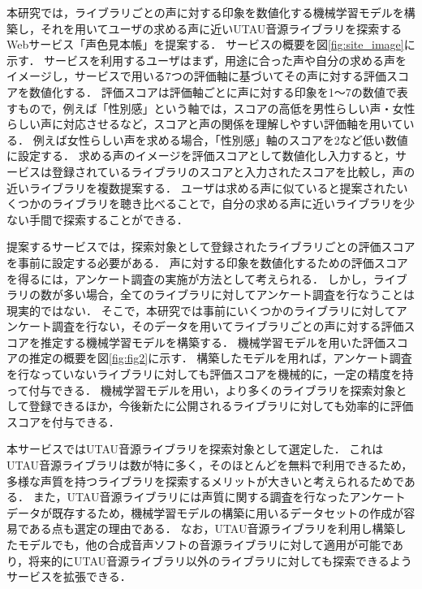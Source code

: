 本研究では，ライブラリごとの声に対する印象を数値化する機械学習モデルを構築し，それを用いてユーザの求める声に近いUTAU音源ライブラリを探索するWebサービス「声色見本帳」を提案する．
サービスの概要を図\ref{fig:site_image}に示す．
サービスを利用するユーザはまず，用途に合った声や自分の求める声をイメージし，サービスで用いる7つの評価軸に基づいてその声に対する評価スコアを数値化する．
評価スコアは評価軸ごとに声に対する印象を1〜7の数値で表すもので，例えば「性別感」という軸では，スコアの高低を男性らしい声・女性らしい声に対応させるなど，スコアと声の関係を理解しやすい評価軸を用いている．
例えば女性らしい声を求める場合，「性別感」軸のスコアを2など低い数値に設定する．
求める声のイメージを評価スコアとして数値化し入力すると，サービスは登録されているライブラリのスコアと入力されたスコアを比較し，声の近いライブラリを複数提案する．
ユーザは求める声に似ていると提案されたいくつかのライブラリを聴き比べることで，自分の求める声に近いライブラリを少ない手間で探索することができる．

提案するサービスでは，探索対象として登録されたライブラリごとの評価スコアを事前に設定する必要がある．
声に対する印象を数値化するための評価スコアを得るには，アンケート調査の実施が方法として考えられる．
しかし，ライブラリの数が多い場合，全てのライブラリに対してアンケート調査を行なうことは現実的ではない．
そこで，本研究では事前にいくつかのライブラリに対してアンケート調査を行ない，そのデータを用いてライブラリごとの声に対する評価スコアを推定する機械学習モデルを構築する．
機械学習モデルを用いた評価スコアの推定の概要を図\ref{fig:fig2}に示す．
構築したモデルを用れば，アンケート調査を行なっていないライブラリに対しても評価スコアを機械的に，一定の精度を持って付与できる．
機械学習モデルを用い，より多くのライブラリを探索対象として登録できるほか，今後新たに公開されるライブラリに対しても効率的に評価スコアを付与できる．

本サービスではUTAU音源ライブラリを探索対象として選定した．
これはUTAU音源ライブラリは数が特に多く，そのほとんどを無料で利用できるため，多様な声質を持つライブラリを探索するメリットが大きいと考えられるためである．
また，UTAU音源ライブラリには声質に関する調査を行なったアンケートデータが既存するため，機械学習モデルの構築に用いるデータセットの作成が容易である点も選定の理由である．
なお，UTAU音源ライブラリを利用し構築したモデルでも，他の合成音声ソフトの音源ライブラリに対して適用が可能であり，将来的にUTAU音源ライブラリ以外のライブラリに対しても探索できるようサービスを拡張できる．

